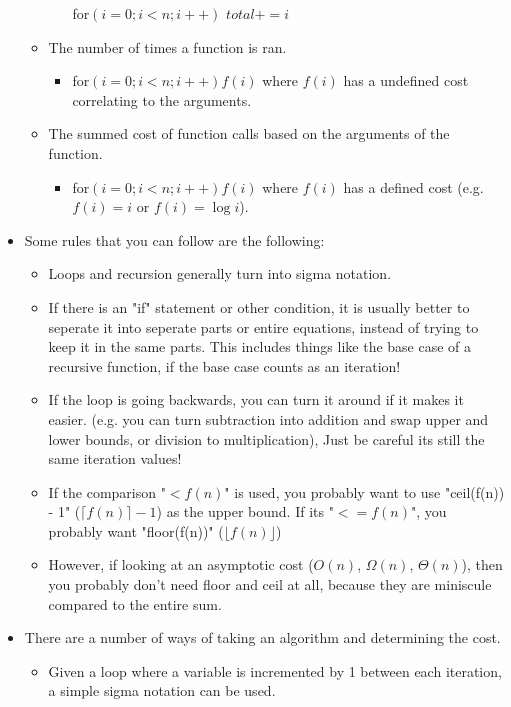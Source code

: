 \documentclass{article}
\begin{document}
\begin{itemize}
\begin{itemize}
\begin{itemize}
                    for$(i = 0; i < n; i++)$ $total += i$
                \end{itemize}
            \item The number of times a function is ran.
                \begin{itemize}
                    \item for$(i = 0; i < n; i++) f(i)$ where $f(i)$ has a undefined cost correlating to the arguments.
                \end{itemize}
            \item The summed cost of function calls based on the arguments of the function.
                \begin{itemize}
                    \item for$(i = 0; i < n; i++) f(i)$ where $f(i)$ has a defined cost (e.g. $f(i) = i$ or $f(i) = \log i$).
                \end{itemize}
		\end{itemize}
	\item Some rules that you can follow are the following:
    	\begin{itemize}
    		\item
				Loops and recursion generally turn into sigma notation.
			\item
				If there is an "if" statement or other condition, it is usually better to seperate it into seperate parts or entire equations, instead of trying to keep it in the same parts. This includes things like the base case of a recursive function, if the base case counts as an iteration!
			\item
				If the loop is going backwards, you can turn it around if it makes it easier. (e.g. you can turn subtraction into addition and swap upper and lower bounds, or division to multiplication), Just be careful its still the same iteration values!
			\item
				If the comparison "$< f(n)$" is used, you probably want to use "ceil(f(n)) - 1" ($\lceil f(n) \rceil - 1$) as the upper bound. If its "$<= f(n)$", you probably want "floor(f(n))" ($\lfloor f(n) \rfloor$)
			\item
				However, if looking at an asymptotic cost ($O(n)$, $\Omega(n)$, $\Theta(n)$), then you probably don't need floor and ceil at all, because they are miniscule compared to the entire sum.
    	\end{itemize}
    \item There are a number of ways of taking an algorithm and determining the cost.
    	\begin{itemize}
    		\item
    			Given a loop where a variable is incremented by 1 between each iteration, a simple sigma notation can be used.
    			

\end{itemize}
\end{itemize}
\end{document}
